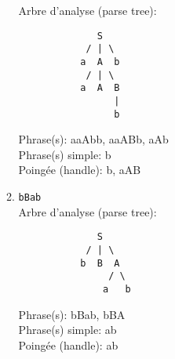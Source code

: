 \documentclass[12pt]{book}
\begin{document}
\begin{enumerate}
\begin{enumerate}
            Arbre d'analyse (parse tree):
\begin{verbatim}
              S
            / | \
           a  A  b
            / | \
           a  A  B
                 |
                 b
\end{verbatim}
            Phrase(s): aaAbb, aaABb, aAb\\
            Phrase(s) simple: b\\
            Poingée (handle): b, aAB\\
            
            \item \texttt{bBab}\\
            
            Arbre d'analyse (parse tree):
\begin{verbatim}
              S
            / | \
           b  B  A
                / \
               a   b
\end{verbatim}
            Phrase(s): bBab, bBA\\
            Phrase(s) simple: ab\\
            Poingée (handle): ab\\
        \end{enumerate}


\end{enumerate}
\end{document}
